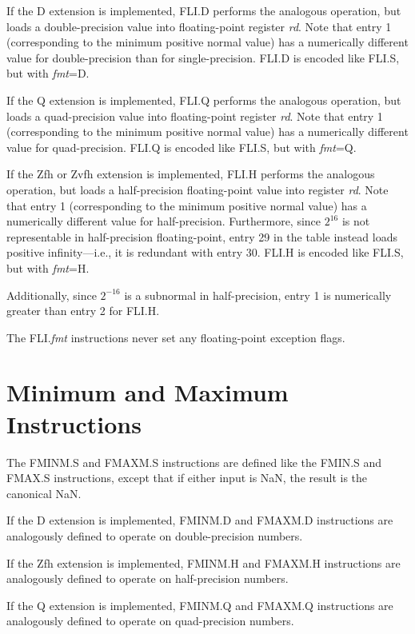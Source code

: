 If the D extension is implemented, FLI.D performs the analogous operation,
but loads a double-precision value into floating-point register {\em rd}.
Note that entry 1 (corresponding to the minimum positive normal value) has a
numerically different value for double-precision than for single-precision.
FLI.D is encoded like FLI.S, but with {\em fmt}=D.

If the Q extension is implemented, FLI.Q performs the analogous operation,
but loads a quad-precision value into floating-point register {\em rd}.
Note that entry 1 (corresponding to the minimum positive normal value) has a
numerically different value for quad-precision.
FLI.Q is encoded like FLI.S, but with {\em fmt}=Q.

If the Zfh or Zvfh extension is implemented, FLI.H performs the analogous
operation, but loads a half-precision floating-point value into register
{\em rd}.
Note that entry 1 (corresponding to the minimum positive normal value) has a
numerically different value for half-precision.
Furthermore,
since $2^{16}$ is not representable in half-precision floating-point, entry 29
in the table instead loads positive infinity---i.e., it is redundant
with entry 30.
FLI.H is encoded like FLI.S, but with {\em fmt}=H.

\begin{commentary}
Additionally, since $2^{-16}$ is a subnormal in half-precision, entry 1 is numerically
greater than entry 2 for FLI.H.
\end{commentary}

The FLI.{\em fmt} instructions never set any floating-point exception flags.


\section{Minimum and Maximum Instructions}

The FMINM.S and FMAXM.S instructions are defined like the FMIN.S and FMAX.S
instructions, except that if either input is NaN, the result is the
canonical NaN.

If the D extension is implemented, FMINM.D and FMAXM.D instructions are
analogously defined to operate on double-precision numbers.

If the Zfh extension is implemented, FMINM.H and FMAXM.H instructions are
analogously defined to operate on half-precision numbers.

If the Q extension is implemented, FMINM.Q and FMAXM.Q instructions are
analogously defined to operate on quad-precision numbers.

